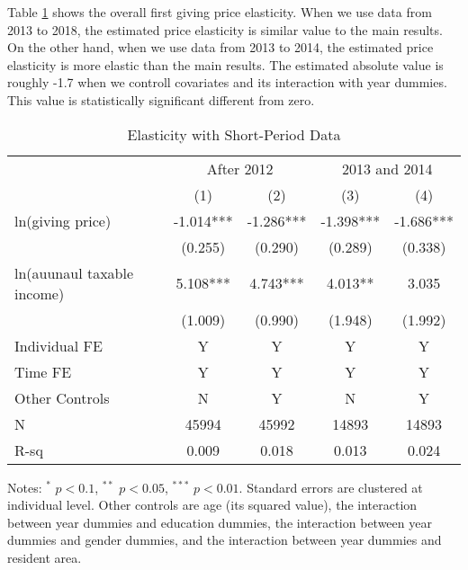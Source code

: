 \documentclass[ review  , 3p ]{elsarticle}
\begin{document}
  \color{black}

  Table \ref{tab:kableShortElasticity1} shows the overall first giving price elasticity.
  When we use data from 2013 to 2018, the estimated price elasticity is similar value to the main results.
  On the other hand,
  when we use data from 2013 to 2014, the estimated price elasticity is more elastic than the main results.
  The estimated absolute value is roughly -1.7 when we controll covariates and its interaction with year dummies.
  This value is statistically significant different from zero.

  \begin{table}

  \caption{\label{tab:kableShortElasticity1}Elasticity with Short-Period Data}
  \centering
  \fontsize{7}{9}\selectfont
  \begin{threeparttable}
  \begin{tabular}[t]{lcccc}
  \toprule
  \multicolumn{1}{c}{ } & \multicolumn{2}{c}{After 2012} & \multicolumn{2}{c}{2013 and 2014} \\
  \cmidrule(l{3pt}r{3pt}){2-3} \cmidrule(l{3pt}r{3pt}){4-5}
   & (1) & (2) & (3) & (4)\\
  \midrule
  ln(giving price) & -1.014*** & -1.286*** & -1.398*** & -1.686***\\
   & (0.255) & (0.290) & (0.289) & (0.338)\\
  ln(auunaul taxable income) & 5.108*** & 4.743*** & 4.013** & 3.035\\
   & (1.009) & (0.990) & (1.948) & (1.992)\\
  Individual FE & Y & Y & Y & Y\\
  Time FE & Y & Y & Y & Y\\
  Other Controls & N & Y & N & Y\\
  N & 45994 & 45992 & 14893 & 14893\\
  R-sq & 0.009 & 0.018 & 0.013 & 0.024\\
  \bottomrule
  \end{tabular}
  \begin{tablenotes}
  \item Notes: $^{*}$ $p < 0.1$, $^{**}$ $p < 0.05$, $^{***}$ $p < 0.01$. Standard errors are clustered at individual level. Other controls are age (its squared value), the interaction between year dummies and education dummies, the interaction between year dummies and gender dummies, and the interaction between year dummies and resident area.
  \end{tablenotes}
  \end{threeparttable}
  \end{table}
\end{document}
